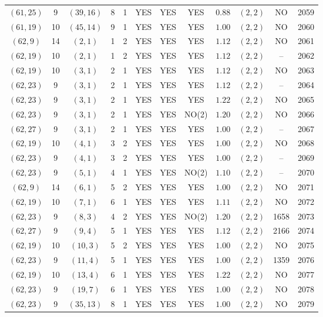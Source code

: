 \begin{longtable}{|c|c|c|c|c|c|c|c|c|c|c|c|}
$(61,25)$ & 9 & $(39,16)$ & 8 & 1 & YES & YES & YES & $0.88$ & $(2,2)$ & NO & 2059\\
$(61,19)$ & 10 & $(45,14)$ & 9 & 1 & YES & YES & YES & $1.00$ & $(2,2)$ & NO & 2060\\
$(62,9)$ & 14 & $(2,1)$ & 1 & 2 & YES & YES & YES & $1.12$ & $(2,2)$ & NO & 2061\\
$(62,19)$ & 10 & $(2,1)$ & 1 & 2 & YES & YES & YES & $1.12$ & $(2,2)$ & -- & 2062\\
$(62,19)$ & 10 & $(3,1)$ & 2 & 1 & YES & YES & YES & $1.12$ & $(2,2)$ & NO & 2063\\
$(62,23)$ & 9 & $(3,1)$ & 2 & 1 & YES & YES & YES & $1.12$ & $(2,2)$ & -- & 2064\\
$(62,23)$ & 9 & $(3,1)$ & 2 & 1 & YES & YES & YES & $1.22$ & $(2,2)$ & NO & 2065\\
$(62,23)$ & 9 & $(3,1)$ & 2 & 1 & YES & YES & NO(2) & $1.20$ & $(2,2)$ & NO & 2066\\
$(62,27)$ & 9 & $(3,1)$ & 2 & 1 & YES & YES & YES & $1.00$ & $(2,2)$ & -- & 2067\\
$(62,19)$ & 10 & $(4,1)$ & 3 & 2 & YES & YES & YES & $1.00$ & $(2,2)$ & NO & 2068\\
$(62,23)$ & 9 & $(4,1)$ & 3 & 2 & YES & YES & YES & $1.00$ & $(2,2)$ & -- & 2069\\
$(62,23)$ & 9 & $(5,1)$ & 4 & 1 & YES & YES & NO(2) & $1.10$ & $(2,2)$ & -- & 2070\\
$(62,9)$ & 14 & $(6,1)$ & 5 & 2 & YES & YES & YES & $1.00$ & $(2,2)$ & NO & 2071\\
$(62,19)$ & 10 & $(7,1)$ & 6 & 1 & YES & YES & YES & $1.11$ & $(2,2)$ & NO & 2072\\
$(62,23)$ & 9 & $(8,3)$ & 4 & 2 & YES & YES & NO(2) & $1.20$ & $(2,2)$ & 1658 & 2073\\
$(62,27)$ & 9 & $(9,4)$ & 5 & 1 & YES & YES & YES & $1.12$ & $(2,2)$ & 2166 & 2074\\
$(62,19)$ & 10 & $(10,3)$ & 5 & 2 & YES & YES & YES & $1.00$ & $(2,2)$ & NO & 2075\\
$(62,23)$ & 9 & $(11,4)$ & 5 & 1 & YES & YES & YES & $1.00$ & $(2,2)$ & 1359 & 2076\\
$(62,19)$ & 10 & $(13,4)$ & 6 & 1 & YES & YES & YES & $1.22$ & $(2,2)$ & NO & 2077\\
$(62,23)$ & 9 & $(19,7)$ & 6 & 1 & YES & YES & YES & $1.00$ & $(2,2)$ & NO & 2078\\
$(62,23)$ & 9 & $(35,13)$ & 8 & 1 & YES & YES & YES & $1.00$ & $(2,2)$ & NO & 2079\\

\end{longtable}

